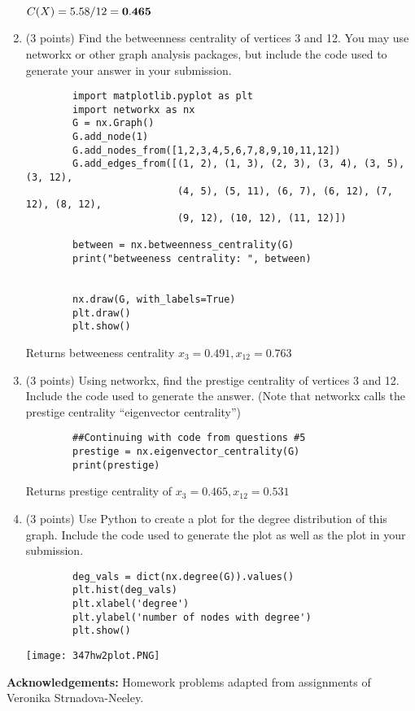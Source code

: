 \documentclass[11pt]{article}
\begin{document}
\begin{enumerate}
    \newline $C(X) = 5.58 / 12 = \bf0.465$
    \item (3 points) Find the betweenness centrality of vertices 3 and 12. You
    may use networkx or other graph analysis packages, but include the code used
    to generate your answer in your submission.
    \newline \begin{lstlisting}
        import matplotlib.pyplot as plt
        import networkx as nx
        G = nx.Graph()
        G.add_node(1)
        G.add_nodes_from([1,2,3,4,5,6,7,8,9,10,11,12])
        G.add_edges_from([(1, 2), (1, 3), (2, 3), (3, 4), (3, 5), (3, 12),
                          (4, 5), (5, 11), (6, 7), (6, 12), (7, 12), (8, 12),
                          (9, 12), (10, 12), (11, 12)])
        
        between = nx.betweenness_centrality(G)
        print("betweeness centrality: ", between)
        
        
        nx.draw(G, with_labels=True)
        plt.draw()
        plt.show()

    \end{lstlisting}  
    \newline Returns betweeness centrality $x_3 = 0.491, x_{12} = 0.763$

    \item (3 points) Using networkx, find the prestige centrality of vertices 3
    and 12. Include the code used to generate the answer. (Note that networkx
    calls the prestige centrality ``eigenvector centrality'')
    \newline \begin{lstlisting}
        ##Continuing with code from questions #5
        prestige = nx.eigenvector_centrality(G)
        print(prestige)
    \end{lstlisting}
    \newline Returns prestige centrality of $x_3 = 0.465, x_{12} = 0.531$
    \newpage
    \item (3 points) Use Python to create a plot for the degree distribution of
    this graph.  Include the code used to generate the plot as well as the plot
    in your submission.
    \newline \begin{lstlisting}
        deg_vals = dict(nx.degree(G)).values()
        plt.hist(deg_vals)
        plt.xlabel('degree')
        plt.ylabel('number of nodes with degree')
        plt.show()
     \end{lstlisting}
     
     \texttt{[image: 347hw2plot.PNG]}

\end{enumerate}

{\bf Acknowledgements:} Homework problems adapted from assignments of
Veronika Strnadova-Neeley.
\end{document}
